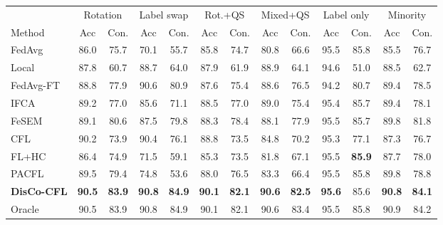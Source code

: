 \begin{tabular}{lcccccccccccc}
\toprule
 & \multicolumn{2}{c}{Rotation} & \multicolumn{2}{c}{Label swap} & \multicolumn{2}{c}{Rot.+QS} & \multicolumn{2}{c}{Mixed+QS} & \multicolumn{2}{c}{Label only} & \multicolumn{2}{c}{Minority} \\
\cmidrule(lr){2-3}\cmidrule(lr){4-5}\cmidrule(lr){6-7}\cmidrule(lr){8-9}\cmidrule(lr){10-11}\cmidrule(lr){12-13}
Method & Acc & Con. & Acc & Con. & Acc & Con. & Acc & Con. & Acc & Con. & Acc & Con. \\
\midrule
FedAvg & 86.0 & 75.7 & 70.1 & 55.7 & 85.8 & 74.7 & 80.8 & 66.6 & 95.5 & 85.8 & 85.5 & 76.7 \\
Local & 87.8 & 60.7 & 88.7 & 64.0 & 87.9 & 61.9 & 88.9 & 64.1 & 94.6 & 51.0 & 88.5 & 62.7 \\
FedAvg-FT & 88.8 & 77.9 & 90.6 & 80.9 & 87.6 & 75.4 & 88.6 & 76.5 & 94.2 & 80.7 & 89.4 & 78.5 \\
IFCA & 89.2 & 77.0 & 85.6 & 71.1 & 88.5 & 77.0 & 89.0 & 75.4 & 95.4 & 85.7 & 89.4 & 78.1 \\
FeSEM & 89.1 & 80.6 & 87.5 & 79.8 & 88.3 & 78.4 & 88.1 & 77.9 & 95.5 & 85.7 & 89.8 & 81.8 \\
CFL & 90.2 & 73.9 & 90.4 & 76.1 & 88.8 & 73.5 & 84.8 & 70.2 & 95.3 & 77.1 & 87.3 & 76.7 \\
FL+HC & 86.4 & 74.9 & 71.5 & 59.1 & 85.3 & 73.5 & 81.8 & 67.1 & 95.5 & \textbf{85.9} & 87.7 & 78.0 \\
PACFL & 89.5 & 79.4 & 74.8 & 53.6 & 88.0 & 76.5 & 83.3 & 66.4 & 95.5 & 85.8 & 89.8 & 78.8 \\
\textbf{DisCo-CFL} & \textbf{90.5} & \textbf{83.9} & \textbf{90.8} & \textbf{84.9} & \textbf{90.1} & \textbf{82.1} & \textbf{90.6} & \textbf{82.5} & \textbf{95.6} & 85.6 & \textbf{90.8} & \textbf{84.1} \\
\midrule
Oracle & 90.5 & 83.9 & 90.8 & 84.9 & 90.1 & 82.1 & 90.6 & 83.4 & 95.5 & 85.8 & 90.9 & 84.2 \\
\bottomrule
\end{tabular}
